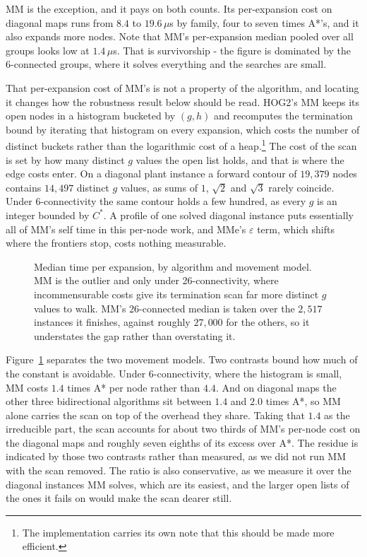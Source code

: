 \documentclass[letterpaper]{article} %
\begin{document}
MM is the exception, and it pays on both counts. Its per-expansion cost on diagonal maps runs from $8.4$ to $19.6\,\mu$s by family, four to seven times A*'s, and it also expands more nodes. Note that MM's per-expansion median pooled over all groups looks low at $1.4\,\mu$s. That is survivorship - the figure is dominated by the 6-connected groups, where it solves everything and the searches are small.

That per-expansion cost of MM's is not a property of the algorithm, and locating it changes how the robustness result below should be read. HOG2's MM keeps its open nodes in a histogram bucketed by $(g,h)$ and recomputes the termination bound by iterating that histogram on every expansion, which costs the number of distinct buckets rather than the logarithmic cost of a heap.\footnote{The implementation carries its own note that this should be made more efficient.} The cost of the scan is set by how many distinct $g$ values the open list holds, and that is where the edge costs enter. On a diagonal plant instance a forward contour of $19{,}379$ nodes contains $14{,}497$ distinct $g$ values, as sums of $1$, $\sqrt{2}$ and $\sqrt{3}$ rarely coincide. Under 6-connectivity the same contour holds a few hundred, as every $g$ is an integer bounded by $C^*$. A profile of one solved diagonal instance puts essentially all of MM's self time in this per-node work, and MMe's $\varepsilon$ term, which shifts where the frontiers stop, costs nothing measurable.

\begin{figure}[t] \centering
  
  \caption{Median time per expansion, by algorithm and movement model. MM is the outlier and only under 26-connectivity, where incommensurable costs give its termination scan far more distinct $g$ values to walk. MM's 26-connected median is taken over the $2{,}517$ instances it finishes, against roughly $27{,}000$ for the others, so it understates the gap rather than overstating it.}\label{fig:pernode}
\end{figure}

Figure~\ref{fig:pernode} separates the two movement models. Two contrasts bound how much of the constant is avoidable. Under 6-connectivity, where the histogram is small, MM costs $1.4$ times A* per node rather than $4.4$. And on diagonal maps the other three bidirectional algorithms sit between $1.4$ and $2.0$ times A*, so MM alone carries the scan on top of the overhead they share. Taking that $1.4$ as the irreducible part, the scan accounts for about two thirds of MM's per-node cost on the diagonal maps and roughly seven eighths of its excess over A*. The residue is indicated by those two contrasts rather than measured, as we did not run MM with the scan removed. The ratio is also conservative, as we measure it over the diagonal instances MM solves, which are its easiest, and the larger open lists of the ones it fails on would make the scan dearer still.
\end{document}
